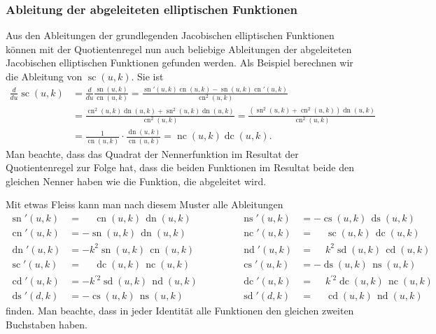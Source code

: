 \subsubsection{Ableitung der abgeleiteten elliptischen Funktionen}
Aus den Ableitungen der grundlegenden Jacobischen elliptischen Funktionen
können mit der Quotientenregel nun auch beliebige Ableitungen der
abgeleiteten Jacobischen elliptischen Funktionen gefunden werden.
Als Beispiel berechnen wir die Ableitung von $\operatorname{sc}(u,k)$.
Sie ist
\begin{align*}
\frac{d}{du}
\operatorname{sc}(u,k)
&=
\frac{d}{du}
\frac{\operatorname{sn}(u,k)}{\operatorname{cn}(u,k)}
=
\frac{
\operatorname{sn}'(u,k)\operatorname{cn}(u,k)
-
\operatorname{sn}(u,k)\operatorname{cn}'(u,k)}{
\operatorname{cn}^2(u,k)
}
\\
&=
\frac{
\operatorname{cn}^2(u,k)\operatorname{dn}(u,k)
+
\operatorname{sn}^2(u,k)\operatorname{dn}(u,k)
}{
\operatorname{cn}^2(u,k)
}
=
\frac{(
\operatorname{sn}^2(u,k)
+
\operatorname{cn}^2(u,k)
)\operatorname{dn}(u,k)}{
\operatorname{cn}^2(u,k)
}
\\
&=
\frac{1}{\operatorname{cn}(u,k)}
\cdot
\frac{\operatorname{dn}(u,k)}{\operatorname{cn}(u,k)}
=
\operatorname{nc}(u,k)
\operatorname{dc}(u,k).
\end{align*}
Man beachte, dass das Quadrat der Nennerfunktion im Resultat
der Quotientenregel zur Folge hat, dass die
beiden Funktionen im Resultat beide den gleichen Nenner haben wie
die Funktion, die abgeleitet wird.

Mit etwas Fleiss kann man nach diesem Muster alle Ableitungen
\begin{equation}
\begin{aligned}
\operatorname{sn}'(u,k)
&= 
\phantom{-}
\operatorname{cn}(u,k)\,\operatorname{dn}(u,k)
&&\qquad&
\operatorname{ns}'(u,k)
&=
-
\operatorname{cs}(u,k)\,\operatorname{ds}(u,k)
\\
\operatorname{cn}'(u,k)
&= 
-
\operatorname{sn}(u,k)\,\operatorname{dn}(u,k)
&&&
\operatorname{nc}'(u,k)
&=
\phantom{-}
\operatorname{sc}(u,k)\,\operatorname{dc}(u,k)
\\
\operatorname{dn}'(u,k)
&= 
-k^2
\operatorname{sn}(u,k)\,\operatorname{cn}(u,k)
&&&
\operatorname{nd}'(u,k)
&=
\phantom{-}
k^2
\operatorname{sd}(u,k)\,\operatorname{cd}(u,k)
\\
\operatorname{sc}'(u,k)
&=
\phantom{-}
\operatorname{dc}(u,k)\,\operatorname{nc}(u,k)
&&&
\operatorname{cs}'(u,k)
&=
-
\operatorname{ds}(u,k)\,\operatorname{ns}(u,k)
\\
\operatorname{cd}'(u,k)
&=
-k^{\prime2}
\operatorname{sd}(u,k)\,\operatorname{nd}(u,k)
&&&
\operatorname{dc}'(u,k)
&=
\phantom{-}
k^{\prime2}
\operatorname{dc}(u,k)\,\operatorname{nc}(u,k)
\\
\operatorname{ds}'(d,k)
&=
-
\operatorname{cs}(u,k)\,\operatorname{ns}(u,k)
&&&
\operatorname{sd}'(d,k)
&=
\phantom{-}
\operatorname{cd}(u,k)\,\operatorname{nd}(u,k)
\end{aligned}
\label{buch:elliptisch:eqn:alleableitungen}
\end{equation}
finden.
Man beachte, dass in jeder Identität alle Funktionen den gleichen
zweiten Buchstaben haben.

